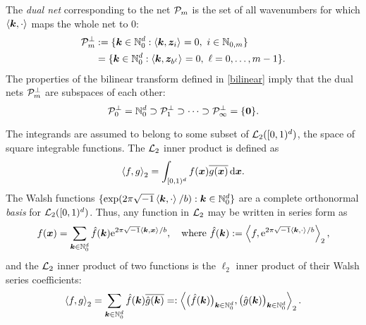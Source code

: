 \documentclass[graybox,footinfo]{svmult}
\newcommand{\N}{\mathbb{N}} %
\newcommand{\bszero}{\boldsymbol{0}} %
\newcommand{\bsx}{\boldsymbol{x}}    %
\newcommand{\bsz}{\boldsymbol{z}}    %
\begin{document}
The \emph{dual net} corresponding to the net $\mathcal{P}_m$ is the set of all wavenumbers for which $\left \langle \boldsymbol{k}, \cdot \right \rangle_{{}}$ maps the whole net to $0$:  
\begin{align*}
\cp^{\perp}_m &:= \{\bsk \in \N_0^d : \ip{\bsk}{\bsz_i} = 0, \ i\in \natm\} \\
&= \{\bsk \in \N_0^d : \ip{\bsk}{\bsz_{b^{\ell}}} = 0, \ \ell=0, \ldots, m-1\}.
\end{align*}
The properties of the bilinear transform defined in \eqref{bilinear} imply that the dual nets $\mathcal{P}^{\perp}_m$ are subspaces of each other: 
\[
\cp_0^{\perp}=\N_0^d \supset \cp_1^{\perp}  \supset \cdots \supset \cp_{\infty}^{\perp} =\{\bszero\}.
\]



The integrands are assumed to belong to some subset of $\mathcal{L}_2([0,1)^d)$, the space of square integrable functions.  The $\mathcal{L}_2$ inner product is defined as 
\[
\ip[2]{f}{g} = \int_{\cube} f(\bsx) \overline{g(\bsx)} \, \D \bsx.
\]
The Walsh functions $\{\exp(2 \pi \sqrt{-1} \ip{\bsk}{\cdot}/b) : \bsk \in \N_0^d\}$ \cite[Appendix A]{DicPil10a} are a complete orthonormal \emph{basis} for $\mathcal{L}_2([0,1)^d)$.  Thus, any function in $\mathcal{L}_2$ may be written in series form as
\begin{equation} \label{Fourierdef}
f(\bsx) = \sum_{\bsk \in \N_0^d} \hf(\bsk) \E^{2 \pi \sqrt{-1} \ip{\bsk}{\bsx}/b}, \quad \text{where } \hf(\bsk) := \ip[2]{f}{\E^{2 \pi \sqrt{-1} \ip{\bsk}{\cdot}/b}},
\end{equation}
and the $\mathcal{L}_2$ inner product of two functions  is the $\ell_2$ inner product of their Walsh series coefficients:
\[
\ip[2]{f}{g} = \sum_{\bsk \in \N_0^d} \hf(\bsk)\overline{\hg(\bsk)} =: \ip[2]{\bigl(\hf(\bsk)\bigr)_{\bsk \in \N_0^d}}{\bigl ( \hg(\bsk)\bigr )_{\bsk \in \N_0^d}}.
\]
\end{document}
